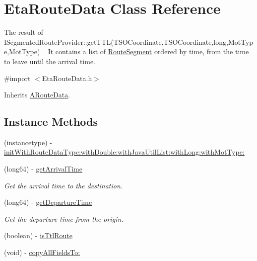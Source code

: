 \hypertarget{interface_eta_route_data}{}\section{Eta\+Route\+Data Class Reference}
\label{interface_eta_route_data}


The result of I\+Segmented\+Route\+Provider\+::get\+T\+T\+L(\+T\+S\+O\+Coordinate,\+T\+S\+O\+Coordinate,long,\+Mot\+Type,\+Mot\+Type) ~\newline
 It contains a list of \hyperlink{interface_route_segment}{Route\+Segment} ordered by time, from the time to leave until the arrival time.  




{\ttfamily \#import $<$Eta\+Route\+Data.\+h$>$}



Inherits \hyperlink{interface_a_route_data}{A\+Route\+Data}.

\subsection*{Instance Methods}
\begin{DoxyCompactItemize}
\item 
(instancetype) -\/ \hyperlink{interface_eta_route_data_a0d3b0ff94a05179ea9789bc052c31b77}{init\+With\+Route\+Data\+Type\+:with\+Double\+:with\+Java\+Util\+List\+:with\+Long\+:with\+Mot\+Type\+:}
\item 
(long64) -\/ \hyperlink{interface_eta_route_data_a4e941afcbfbeb5c662b31aad98516165}{get\+Arrival\+Time}
\begin{DoxyCompactList}\small\item\em Get the arrival time to the destination. \end{DoxyCompactList}\item 
(long64) -\/ \hyperlink{interface_eta_route_data_a6da937cb9ecae71c33162a26ebe815dc}{get\+Departure\+Time}
\begin{DoxyCompactList}\small\item\em Get the departure time from the origin. \end{DoxyCompactList}\item 
(boolean) -\/ \hyperlink{interface_eta_route_data_a6f6da2ab038b4531b33720695bee0183}{is\+Ttl\+Route}
\item 
(void) -\/ \hyperlink{interface_eta_route_data_a8df88e689a7b3e2041153153a20b91e0}{copy\+All\+Fields\+To\+:}
\end{DoxyCompactItemize}
